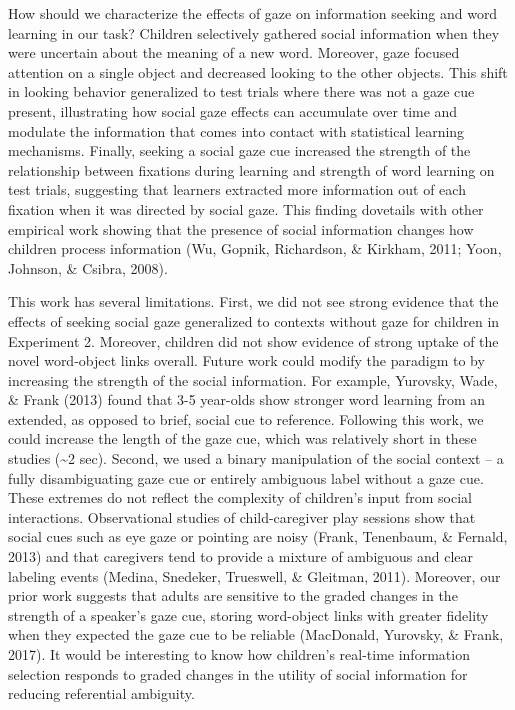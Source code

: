 \documentclass[10pt, letterpaper]{article}
\begin{document}
How should we characterize the effects of gaze on information seeking
and word learning in our task? Children selectively gathered social
information when they were uncertain about the meaning of a new word.
Moreover, gaze focused attention on a single object and decreased
looking to the other objects. This shift in looking behavior generalized
to test trials where there was not a gaze cue present, illustrating how
social gaze effects can accumulate over time and modulate the
information that comes into contact with statistical learning
mechanisms. Finally, seeking a social gaze cue increased the strength of
the relationship between fixations during learning and strength of word
learning on test trials, suggesting that learners extracted more
information out of each fixation when it was directed by social gaze.
This finding dovetails with other empirical work showing that the
presence of social information changes how children process information
(Wu, Gopnik, Richardson, \& Kirkham, 2011; Yoon, Johnson, \& Csibra,
2008).

This work has several limitations. First, we did not see strong evidence
that the effects of seeking social gaze generalized to contexts without
gaze for children in Experiment 2. Moreover, children did not show
evidence of strong uptake of the novel word-object links overall. Future
work could modify the paradigm to by increasing the strength of the
social information. For example, Yurovsky, Wade, \& Frank (2013) found
that 3-5 year-olds show stronger word learning from an extended, as
opposed to brief, social cue to reference. Following this work, we could
increase the length of the gaze cue, which was relatively short in these
studies (\textasciitilde{}2 sec). Second, we used a binary manipulation
of the social context -- a fully disambiguating gaze cue or entirely
ambiguous label without a gaze cue. These extremes do not reflect the
complexity of children's input from social interactions. Observational
studies of child-caregiver play sessions show that social cues such as
eye gaze or pointing are noisy (Frank, Tenenbaum, \& Fernald, 2013) and
that caregivers tend to provide a mixture of ambiguous and clear
labeling events (Medina, Snedeker, Trueswell, \& Gleitman, 2011).
Moreover, our prior work suggests that adults are sensitive to the
graded changes in the strength of a speaker's gaze cue, storing
word-object links with greater fidelity when they expected the gaze cue
to be reliable (MacDonald, Yurovsky, \& Frank, 2017). It would be
interesting to know how children's real-time information selection
responds to graded changes in the utility of social information for
reducing referential ambiguity.
\end{document}
